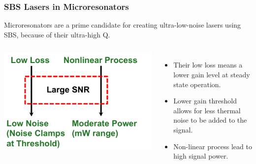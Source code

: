 \documentclass{beamer}
\begin{document}
\begin{frame}\frametitle{SBS Lasers in Microresonators}
Microresonators are a prime candidate for creating ultra-low-noise lasers using SBS, because of their ultra-high Q.
\begin{columns}
\includegraphics[width=1.0\textwidth]{Images/SBS_Microres_SNR.png}
\begin{itemize}
\item Their low loss means a lower gain level at steady state operation.
\item Lower gain threshold allows for less thermal noise to be added to the signal.
\item Non-linear process lead to high signal power.

\end{itemize}
\end{columns}
\end{frame}
\end{document}
